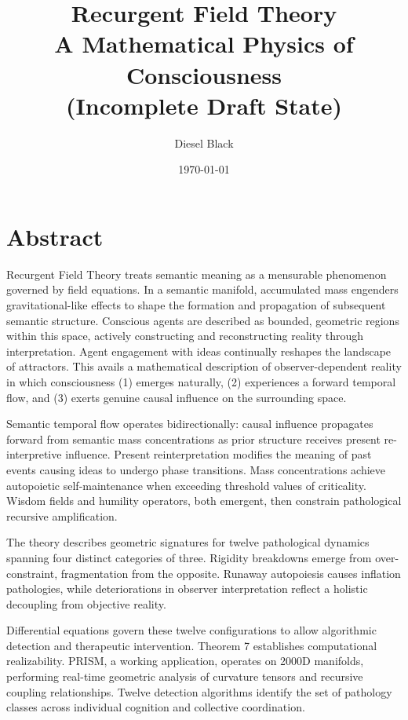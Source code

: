 \documentclass[11pt, a4paper]{report}
\title{Recurgent Field Theory \\ A Mathematical Physics of Consciousness \\ \small{(Incomplete Draft State)}}
\author{Diesel Black}
\date{\today}
\begin{document}

\maketitle

\section*{Abstract}

Recurgent Field Theory treats semantic meaning as a mensurable phenomenon governed by field equations. In a semantic manifold, accumulated mass engenders gravitational-like effects to shape the formation and propagation of subsequent semantic structure. Conscious agents are described as bounded, geometric regions within this space, actively constructing and reconstructing reality through interpretation. Agent engagement with ideas continually reshapes the landscape of attractors. This avails a mathematical description of observer-dependent reality in which consciousness (1) emerges naturally, (2) experiences a forward temporal flow, and (3) exerts genuine causal influence on the surrounding space.

\vspace{1em}

Semantic temporal flow operates bidirectionally: causal influence propagates forward from semantic mass concentrations as prior structure receives present re-interpretive influence. Present reinterpretation modifies the meaning of past events causing ideas to undergo phase transitions. Mass concentrations achieve autopoietic self-maintenance when exceeding threshold values of criticality. Wisdom fields and humility operators, both emergent, then constrain pathological recursive amplification.

\vspace{1em}

The theory describes geometric signatures for twelve pathological dynamics spanning four distinct categories of three. Rigidity breakdowns emerge from over-constraint, fragmentation from the opposite. Runaway autopoiesis causes inflation pathologies, while deteriorations in observer interpretation reflect a holistic decoupling from objective reality.

\vspace{1em}

Differential equations govern these twelve configurations to allow algorithmic detection and therapeutic intervention. Theorem 7 establishes computational realizability. PRISM, a working application, operates on 2000D manifolds, performing real-time geometric analysis of curvature tensors and recursive coupling relationships. Twelve detection algorithms identify the set of pathology classes across individual cognition and collective coordination.
\end{document}
